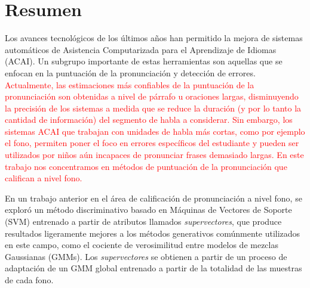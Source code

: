 \chapter*{Resumen}

Los avances tecnológicos de los últimos años han permitido la mejora de sistemas
automáticos de Asistencia Computarizada para el Aprendizaje de Idiomas (ACAI).
Un subgrupo importante de estas herramientas son aquellas que se enfocan en la
puntuación de la pronunciación y detección de errores.
\textcolor{red}{
Actualmente, las estimaciones más confiables de la puntuación de la pronunciación
son obtenidas a nivel de párrafo u oraciones largas, disminuyendo la precisión
de los sistemas a medida que se reduce la duración
(y por lo tanto la cantidad de información) del segmento de habla a considerar.
Sin embargo, los sistemas ACAI que trabajan con unidades de habla
más cortas, como por ejemplo el fono,
permiten poner el foco en errores específicos del estudiante y
pueden ser utilizados por niños aún incapaces de pronunciar frases
demasiado largas.
En este trabajo nos concentramos en métodos de puntuación de la pronunciación
que califican a nivel fono.
}


En un trabajo anterior en el área de calificación de pronunciación a nivel fono,
se exploró
un método discriminativo basado en Máquinas de Vectores de Soporte (SVM) entrenado
a partir de atributos llamados \textit{supervectores},
que produce resultados ligeramente mejores a los métodos
generativos comúnmente utilizados en este campo, como el cociente de verosimilitud
entre modelos de mezclas Gaussianas (GMMs). Los \textit{supervectores} se obtienen a partir de
un proceso de adaptación de un GMM global entrenado a partir de la totalidad
de las muestras de cada fono.

